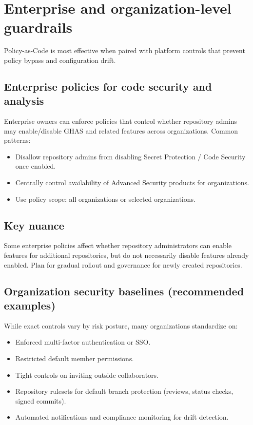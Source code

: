 \documentclass[11pt]{article}
\begin{document}
\section{Enterprise and organization-level guardrails}

Policy-as-Code is most effective when paired with platform controls that prevent policy bypass and configuration drift.

\subsection{Enterprise policies for code security and analysis}

Enterprise owners can enforce policies that control whether repository admins may enable/disable GHAS and related features across organizations. Common patterns:
\begin{itemize}[leftmargin=*]
  \item Disallow repository admins from disabling Secret Protection / Code Security once enabled.
  \item Centrally control availability of Advanced Security products for organizations.
  \item Use policy scope: all organizations or selected organizations.
\end{itemize}

\subsection{Key nuance}

Some enterprise policies affect whether repository administrators can enable features for additional repositories, but do not necessarily disable features already enabled. Plan for gradual rollout and governance for newly created repositories.

\subsection{Organization security baselines (recommended examples)}

While exact controls vary by risk posture, many organizations standardize on:
\begin{itemize}[leftmargin=*]
  \item Enforced multi-factor authentication or SSO.
  \item Restricted default member permissions.
  \item Tight controls on inviting outside collaborators.
  \item Repository rulesets for default branch protection (reviews, status checks, signed commits).
  \item Automated notifications and compliance monitoring for drift detection.
\end{itemize}
\end{document}
